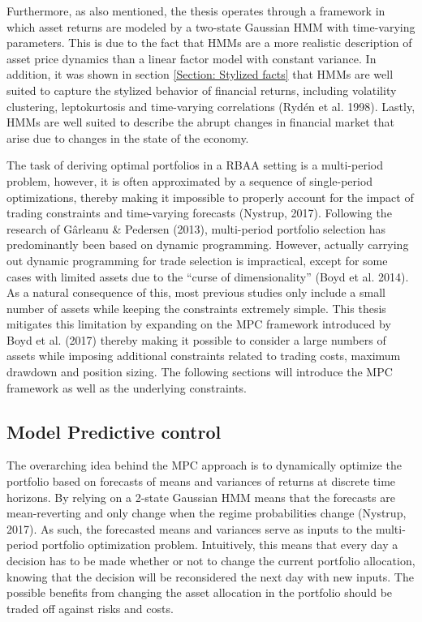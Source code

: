 Furthermore, as also mentioned, the thesis operates through a framework in which asset returns are modeled by a two-state Gaussian HMM with time-varying parameters. This is due to the fact that HMMs are a more realistic description of asset price dynamics than a linear factor model with constant variance. In addition, it was shown in section \ref{Section: Stylized facts} that HMMs are well suited to capture the stylized behavior of financial returns, including volatility clustering, leptokurtosis and time-varying correlations (Rydén et al. 1998). Lastly, HMMs are well suited to describe the abrupt changes in financial market that arise due to changes in the state of the economy.   

The task of deriving optimal portfolios in a RBAA setting is a multi-period problem, however, it is often approximated by a sequence of single-period optimizations, thereby making it impossible to properly account for the impact of trading constraints and time-varying forecasts (Nystrup, 2017). Following the research of Gârleanu \& Pedersen (2013), multi-period portfolio selection has predominantly been based on dynamic programming. However, actually carrying out dynamic programming for trade selection is impractical, except for some cases with limited assets due to the “curse of dimensionality” (Boyd et al. 2014). As a natural consequence of this, most previous studies only include a small number of assets while keeping the constraints extremely simple. This thesis mitigates this limitation by expanding on the MPC framework introduced by Boyd et al. (2017) thereby making it possible to consider a large numbers of assets while imposing additional constraints related to trading costs, maximum drawdown and position sizing. The following sections will introduce the MPC framework as well as the underlying constraints.

\subsection{Model Predictive control}
\label{Subsection: Model predictive control}

The overarching idea behind the MPC approach is to dynamically optimize the portfolio based on forecasts of means and variances of returns at discrete time horizons. By relying on a 2-state Gaussian HMM means that the forecasts are mean-reverting and only change when the regime probabilities change (Nystrup, 2017). As such, the forecasted means and variances serve as inputs to the multi-period portfolio optimization problem. Intuitively, this means that every day a decision has to be made whether or not to change the current portfolio allocation, knowing that the decision will be reconsidered the next day with new inputs. The possible benefits from changing the asset allocation in the portfolio should be traded off against risks and costs. 

